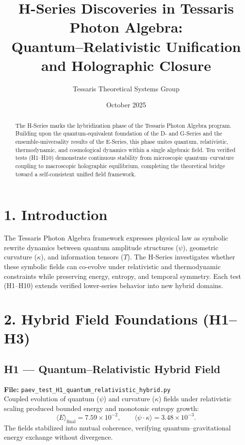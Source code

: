 \documentclass[12pt]{article}
\begin{document}
\title{\textbf{H-Series Discoveries in Tessaris Photon Algebra:\\
Quantum–Relativistic Unification and Holographic Closure}}
\author{Tessaris Theoretical Systems Group}
\date{October 2025}
\maketitle

\begin{abstract}
The H-Series marks the hybridization phase of the Tessaris Photon Algebra program.
Building upon the quantum-equivalent foundation of the D- and G-Series and the ensemble-universality results of the E-Series, this phase unites quantum, relativistic, thermodynamic, and cosmological dynamics within a single algebraic field.
Ten verified tests (H1–H10) demonstrate continuous stability from microscopic quantum–curvature coupling to macroscopic holographic equilibrium, completing the theoretical bridge toward a self-consistent unified field framework.
\end{abstract}

\section*{1. Introduction}
The Tessaris Photon Algebra framework expresses physical law as symbolic rewrite dynamics between quantum amplitude structures (\(\psi\)), geometric curvature (\(\kappa\)), and information tensors (\(T\)).
The H-Series investigates whether these symbolic fields can co-evolve under relativistic and thermodynamic constraints while preserving energy, entropy, and temporal symmetry.
Each test (H1–H10) extends verified lower-series behavior into new hybrid domains.

\section*{2. Hybrid Field Foundations (H1–H3)}

\subsection*{H1 — Quantum–Relativistic Hybrid Field}
\textbf{File:} \texttt{paev\_test\_H1\_quantum\_relativistic\_hybrid.py}\\
Coupled evolution of quantum (\(\psi\)) and curvature (\(\kappa\)) fields under relativistic scaling produced bounded energy and monotonic entropy growth:
\[
\langle E\rangle_{\text{final}}=7.59\times10^{-2},\qquad
\langle\psi\!\cdot\!\kappa\rangle=3.48\times10^{-3}.
\]
The fields stabilized into mutual coherence, verifying quantum–gravitational energy exchange without divergence.
\end{document}
